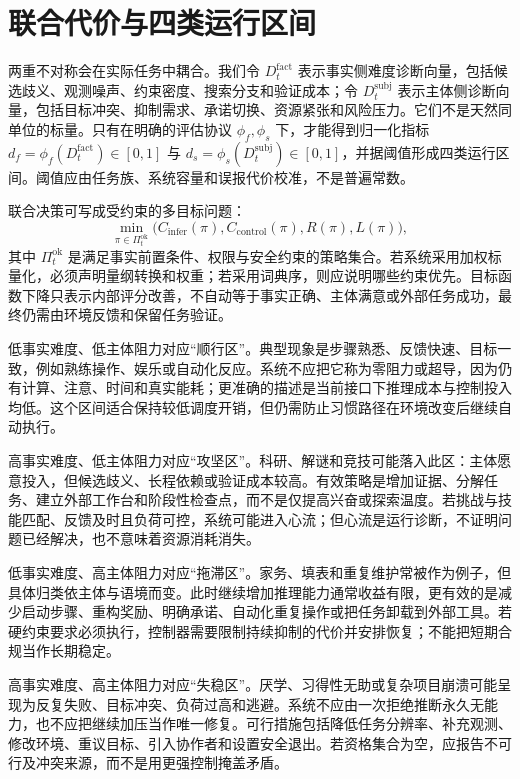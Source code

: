 \section{联合代价与四类运行区间}
\label{sec:quadrants_of_thought}

两重不对称会在实际任务中耦合。我们令 $D_t^{\mathrm{fact}}$ 表示事实侧难度诊断向量，包括候选歧义、观测噪声、约束密度、搜索分支和验证成本；令 $D_t^{\mathrm{subj}}$ 表示主体侧诊断向量，包括目标冲突、抑制需求、承诺切换、资源紧张和风险压力。它们不是天然同单位的标量。只有在明确的评估协议 $\phi_f,\phi_s$ 下，才能得到归一化指标 $d_f=\phi_f(D_t^{\mathrm{fact}})\in[0,1]$ 与 $d_s=\phi_s(D_t^{\mathrm{subj}})\in[0,1]$，并据阈值形成四类运行区间。阈值应由任务族、系统容量和误报代价校准，不是普遍常数。

联合决策可写成受约束的多目标问题：
\begin{equation}
\min_{\pi\in\Pi_t^{\mathrm{ok}}}
\bigl(C_{\mathrm{infer}}(\pi),C_{\mathrm{control}}(\pi),R(\pi),L(\pi)\bigr),
\end{equation}
其中 $\Pi_t^{\mathrm{ok}}$ 是满足事实前置条件、权限与安全约束的策略集合。若系统采用加权标量化，必须声明量纲转换和权重；若采用词典序，则应说明哪些约束优先。目标函数下降只表示内部评分改善，不自动等于事实正确、主体满意或外部任务成功，最终仍需由环境反馈和保留任务验证。

低事实难度、低主体阻力对应“顺行区”。典型现象是步骤熟悉、反馈快速、目标一致，例如熟练操作、娱乐或自动化反应。系统不应把它称为零阻力或超导，因为仍有计算、注意、时间和真实能耗；更准确的描述是当前接口下推理成本与控制投入均低。这个区间适合保持较低调度开销，但仍需防止习惯路径在环境改变后继续自动执行。

高事实难度、低主体阻力对应“攻坚区”。科研、解谜和竞技可能落入此区：主体愿意投入，但候选歧义、长程依赖或验证成本较高。有效策略是增加证据、分解任务、建立外部工作台和阶段性检查点，而不是仅提高兴奋或探索温度。若挑战与技能匹配、反馈及时且负荷可控，系统可能进入心流；但心流是运行诊断，不证明问题已经解决，也不意味着资源消耗消失。

低事实难度、高主体阻力对应“拖滞区”。家务、填表和重复维护常被作为例子，但具体归类依主体与语境而变。此时继续增加推理能力通常收益有限，更有效的是减少启动步骤、重构奖励、明确承诺、自动化重复操作或把任务卸载到外部工具。若硬约束要求必须执行，控制器需要限制持续抑制的代价并安排恢复；不能把短期合规当作长期稳定。

高事实难度、高主体阻力对应“失稳区”。厌学、习得性无助或复杂项目崩溃可能呈现为反复失败、目标冲突、负荷过高和逃避。系统不应由一次拒绝推断永久无能力，也不应把继续加压当作唯一修复。可行措施包括降低任务分辨率、补充观测、修改环境、重议目标、引入协作者和设置安全退出。若资格集合为空，应报告不可行及冲突来源，而不是用更强控制掩盖矛盾。

